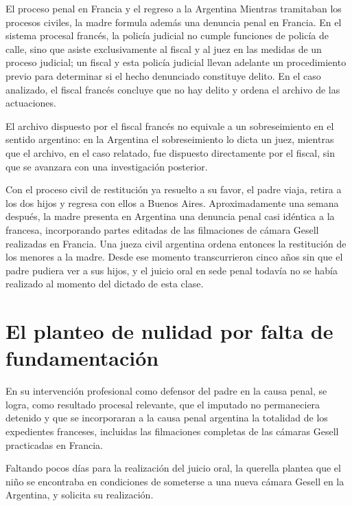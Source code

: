 \documentclass[12pt,oneside]{book}
\begin{document}
\begin{example}{El proceso penal en Francia y el regreso a la Argentina}
Mientras tramitaban los procesos civiles, la madre formula además una denuncia penal en Francia. En el sistema procesal francés, la policía judicial no cumple funciones de policía de calle, sino que asiste exclusivamente al fiscal y al juez en las medidas de un proceso judicial; un fiscal y esta policía judicial llevan adelante un procedimiento previo para determinar si el hecho denunciado constituye delito. En el caso analizado, el fiscal francés concluye que no hay delito y ordena el archivo de las actuaciones.

\begin{note}
El archivo dispuesto por el fiscal francés no equivale a un sobreseimiento en el sentido argentino: en la Argentina el sobreseimiento lo dicta un juez, mientras que el archivo, en el caso relatado, fue dispuesto directamente por el fiscal, sin que se avanzara con una investigación posterior.
\end{note}

Con el proceso civil de restitución ya resuelto a su favor, el padre viaja, retira a los dos hijos y regresa con ellos a Buenos Aires. Aproximadamente una semana después, la madre presenta en Argentina una denuncia penal casi idéntica a la francesa, incorporando partes editadas de las filmaciones de cámara Gesell realizadas en Francia. Una jueza civil argentina ordena entonces la restitución de los menores a la madre. Desde ese momento transcurrieron cinco años sin que el padre pudiera ver a sus hijos, y el juicio oral en sede penal todavía no se había realizado al momento del dictado de esta clase.
\end{example}

\section{El planteo de nulidad por falta de fundamentación}

En su intervención profesional como defensor del padre en la causa penal, se logra, como resultado procesal relevante, que el imputado no permaneciera detenido y que se incorporaran a la causa penal argentina la totalidad de los expedientes franceses, incluidas las filmaciones completas de las cámaras Gesell practicadas en Francia.

Faltando pocos días para la realización del juicio oral, la querella plantea que el niño se encontraba en condiciones de someterse a una nueva cámara Gesell en la Argentina, y solicita su realización.
\end{document}
